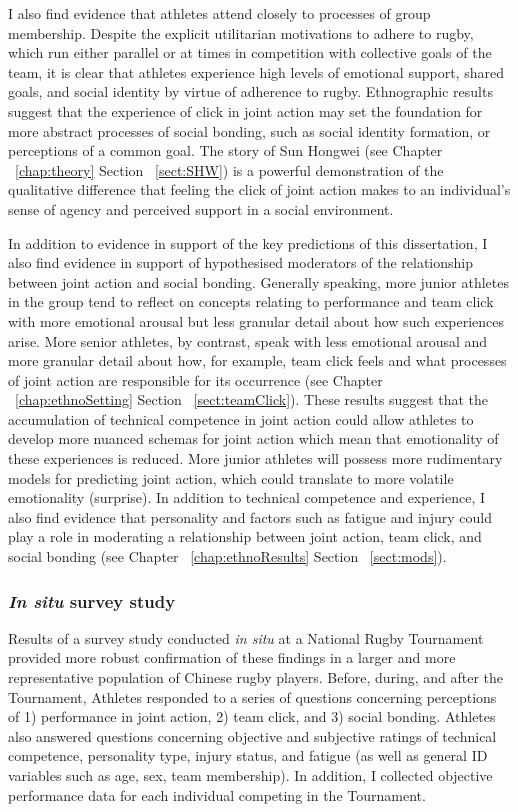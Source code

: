 I also find evidence that athletes attend closely to processes of group membership.  Despite the explicit utilitarian motivations to adhere to rugby, which run either parallel or at times in competition with collective goals of the team, it is clear that athletes experience high levels of emotional support, shared goals, and social identity by virtue of adherence to rugby.  Ethnographic results suggest that the experience of click in joint action may set the foundation for more abstract processes of social bonding, such as social identity formation, or perceptions of a common goal. The story of Sun Hongwei (see Chapter ~\ref{chap:theory} Section ~\ref{sect:SHW}) is a powerful demonstration of the qualitative difference that feeling the click of joint action makes to an individual's sense of agency and perceived support in a social environment.

In addition to evidence in support of the key predictions of this dissertation, I also find evidence in support of hypothesised moderators of the relationship between joint action and social bonding.  Generally speaking, more junior athletes in the group tend to reflect on concepts relating to performance and team click with more emotional arousal but less granular detail about how such experiences arise.  More senior athletes, by contrast, speak with less emotional arousal and more granular detail about how, for example, team click feels and what processes of joint action are responsible for its occurrence (see Chapter ~\ref{chap:ethnoSetting} Section ~\ref{sect:teamClick}).  These results suggest that the accumulation of technical competence in joint action could allow athletes to develop more nuanced schemas for joint action which mean that emotionality of these experiences is reduced.  More junior athletes will possess more rudimentary models for predicting joint action, which could translate to more volatile emotionality (surprise).  In addition to technical competence and experience, I also find evidence that personality and factors such as fatigue and injury could play a role in moderating a relationship between joint action, team click, and social bonding (see Chapter ~\ref{chap:ethnoResults} Section ~\ref{sect:mods}).

\subsubsection{\textit{In situ} survey study}

Results of a survey study conducted \textit{in situ} at a National Rugby Tournament provided more robust confirmation of these findings in a larger and more representative population of Chinese rugby players.  Before, during, and after the Tournament, Athletes responded to a series of questions concerning perceptions of 1) performance in joint action, 2) team click, and 3) social bonding.  Athletes also answered questions concerning objective and subjective ratings of technical competence, personality type, injury status, and fatigue (as well as general ID variables such as age, sex, team membership). In addition, I collected objective performance data for each individual competing in the Tournament.

